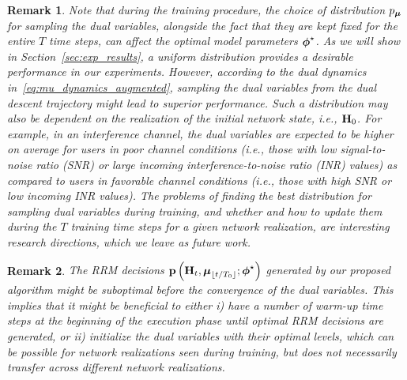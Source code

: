 \documentclass[lettersize,journal]{IEEEtran}
\newtheorem{remark}{\hspace{0pt}\bf Remark}
\begin{document}
\begin{remark}
Note that during the training procedure, the choice of distribution $p_{\boldsymbol{\mu}}$ for sampling the dual variables, alongside the fact that they are kept fixed for the entire $T$ time steps, can affect the optimal model parameters $\boldsymbol{\phi}^{\star}$. As we will show in Section~\ref{sec:exp_results}, a uniform distribution provides a desirable performance in our experiments. However, according to the dual dynamics in~\eqref{eq:mu_dynamics_augmented}, sampling the dual variables from the dual descent trajectory might lead to superior performance. Such a distribution may also be dependent on the realization of the initial network state, i.e., ${\mathbf H}_0$. For example, in an interference channel, the dual variables are expected to be higher on average for users in poor channel conditions (i.e., those with low signal-to-noise ratio (SNR) or large incoming interference-to-noise ratio (INR) values) as compared to users in favorable channel conditions (i.e., those with high SNR or low incoming INR values). The problems of finding the best distribution for sampling dual variables during training, and whether and how to update them during the $T$ training time steps for a given network realization, are interesting research directions, which we leave as future work.
\end{remark}

\begin{remark}
The RRM decisions ${\mathbf p}\left({\mathbf H}_t, \boldsymbol{\mu}_{\lfloor t/T_0 \rfloor}; \boldsymbol{\phi}^{\star}\right)$ generated by our proposed algorithm might be suboptimal before the convergence of the dual variables. This implies that it might be beneficial to either i) have a number of warm-up time steps at the beginning of the execution phase until optimal RRM decisions are generated, or ii) initialize the dual variables with their optimal levels, which can be possible for network realizations seen during training, but does not necessarily transfer across different network realizations.
\end{remark}


\pagebreak
\end{document}
